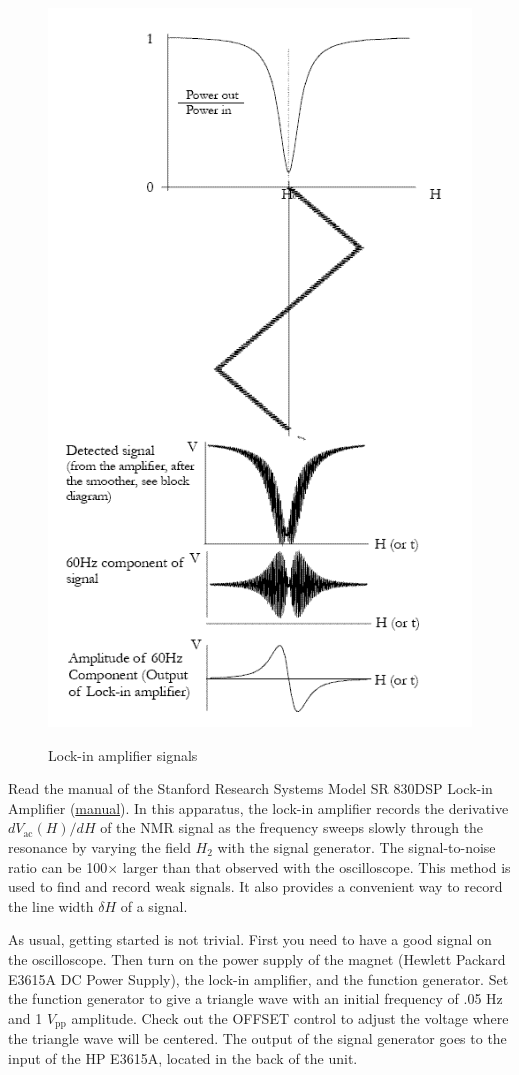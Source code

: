 \documentclass{../lab}
\begin{document}
\begin{figure}[h]
    \centering
    \href{http://experimentationlab.berkeley.edu/sites/default/files/lockinampsignals.png}{\includegraphics[width=0.5\linewidth]{images/lockinampsignals.png}}
    \caption{Lock-in amplifier signals}
    \label{fig:LockInAmplifierSignals}
\end{figure}

\newpage

Read the manual of the Stanford Research Systems Model SR 830DSP Lock-in Amplifier (\href{http://physics111.lib.berkeley.edu/Physics111/Equipment_Manuals/SRS/SR830m.pdf}{manual}). In this apparatus, the lock-in amplifier records the derivative $dV_\text{ac}(H)/dH$ of the NMR signal as the frequency sweeps slowly through the resonance by varying the field $H_2$ with the signal generator. The signal-to-noise ratio can be 100$\times$ larger than that observed with the oscilloscope. This method is used to find and record weak signals. It also provides a convenient way to record the line width $\delta H$ of a signal.

As usual, getting started is not trivial. First you need to have a good signal on the oscilloscope. Then turn on the power supply of the magnet (Hewlett Packard E3615A DC Power Supply), the lock-in amplifier, and the function generator. Set the function generator to give a triangle wave with an initial frequency of .05 Hz and 1 $V_\text{pp}$ amplitude. Check out the OFFSET control to adjust the voltage where the triangle wave will be centered. The output of the signal generator goes to the input of the HP E3615A, located in the back of the unit.
\end{document}
